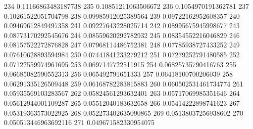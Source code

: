 234 0.11166863483187738
235 0.10851211063506672
236 0.1054970191362781
237 0.10261522051704798
238 0.09985912025389564
239 0.09722162952608357
240 0.09469612849497358
241 0.09227643228025714
242 0.08995675945998677
243 0.08773170292545676
244 0.08559620292782932
245 0.08354552216046829
246 0.08157522272876828
247 0.07968114486752381
248 0.07785938727433252
249 0.07610628893594984
250 0.07441841233279212
251 0.07279252791480585
252 0.07122559974961695
253 0.0697147722511915
254 0.06825735790416763
255 0.06685082590552313
256 0.065492791651333
257 0.06418100700206039
258 0.06291335126509448
259 0.06168782283815883
260 0.060502531461734774
261 0.05935569103283567
262 0.05824561293632401
263 0.05717069985351646
264 0.05612944001109287
265 0.05512040183632658
266 0.05414222898741623
267 0.05319363573022925
268 0.052273402635090865
269 0.05138037256938602
270 0.050513446963692116
271 0.049671582330954075
